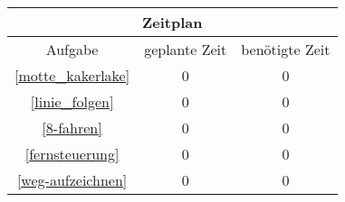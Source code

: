 
\begin{center}
	\begin{tabular}{ | c | c | c | }
		\hline
		\multicolumn{3}{|c|}{Zeitplan} \\	
		\hline
		Aufgabe & geplante Zeit & benötigte Zeit \\
		\hline
		\hline
		\nameref{motte_kakerlake} \ref{motte_kakerlake}  & 0 & 0 \\ 
		\hline
		\nameref{linie_folgen} \ref{linie_folgen} & 0 & 0 \\ 
		\hline
		\nameref{8-fahren} \ref{8-fahren} & 0 & 0 \\ 
		\hline
		\nameref{fernsteuerung} \ref{fernsteuerung} & 0 & 0 \\ 
		\hline
		\nameref{weg-aufzeichnen} \ref{weg-aufzeichnen} & 0 & 0 \\ 
		\hline
  \end{tabular}
\end{center}
